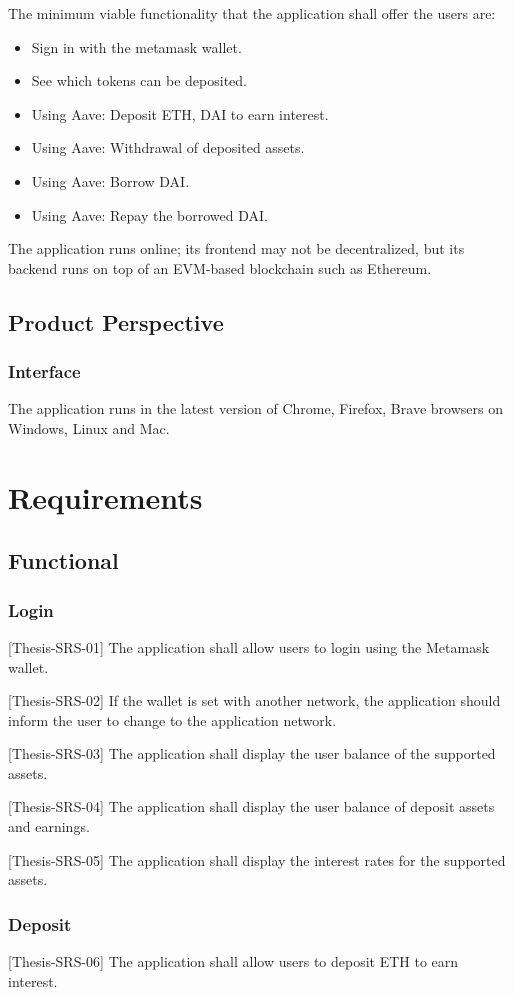 \documentclass[11pt,a4paper]{report}
\begin{document}
The minimum viable functionality that the application shall offer the users are:
\begin{itemize}
	\item Sign in with the metamask wallet.
	\item See which tokens can be deposited.
	\item Using Aave: Deposit ETH, DAI to earn interest. 
	\item Using Aave: Withdrawal of deposited assets.
	\item Using Aave: Borrow DAI.
	\item Using Aave: Repay the borrowed DAI.
\end{itemize}
The application runs online; its frontend may not be decentralized, but its backend runs on top of an EVM-based blockchain such as Ethereum.
\subsection{Product Perspective}
\subsubsection{Interface}
The application runs in the latest version of Chrome, Firefox, Brave browsers on Windows, Linux and Mac.

\section{Requirements}
\subsection{Functional}
\subsubsection{Login}
[Thesis-SRS-01] The application shall allow users to login using the Metamask\cite{wiki:MetaMask} wallet.

[Thesis-SRS-02]  If the wallet is set with another network, the application should inform the user to change to the application network.

[Thesis-SRS-03] The application shall display the user balance of the supported assets.

[Thesis-SRS-04] The application shall display the user balance of deposit assets and earnings.

[Thesis-SRS-05] The application shall display the interest rates for the supported assets.
\subsubsection{Deposit}
[Thesis-SRS-06] The application shall allow users to deposit ETH to earn interest.
\end{document}
